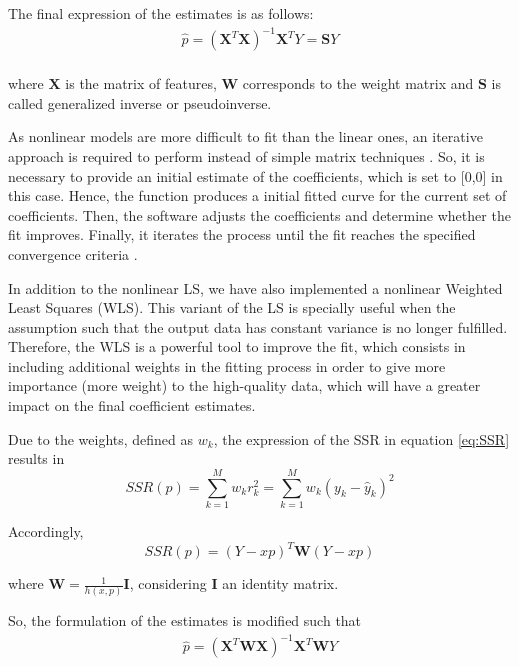 \documentclass[a4paper, report, oneside, UKenglish]{memoir}
\begin{document}
The final expression of the estimates is as follows:
\begin{equation}\label{eq:estimatorLS}
\begin{split}
    \hat{p} = (\textbf{X}^{T}\textbf{X})^{-1}\textbf{X}^{T}Y = \textbf{S}Y\\
\end{split}
\end{equation}

where $\textbf{X}$ is the matrix of features, $\textbf{W}$ corresponds to the weight matrix and $\textbf{S}$ is called generalized inverse or pseudoinverse.

As nonlinear models are more difficult to fit than the linear ones, an iterative approach is required to perform instead of simple matrix techniques \cite{MathWorksRegression}. So, it is necessary to provide an initial estimate of the coefficients, which is set to [0,0] in this case. Hence, the function produces a initial fitted curve for the current set of coefficients. Then, the software adjusts the coefficients and determine whether the fit improves. Finally, it iterates the process until the fit reaches the specified convergence criteria \cite{MathWorksRegression}. 

In addition to the nonlinear LS, we have also implemented a nonlinear Weighted Least Squares (WLS). This variant of the LS is specially useful when the assumption such that the output data has constant variance is no longer fulfilled. Therefore, the WLS is a powerful tool to improve the fit, which consists in including additional weights in the fitting process in order to give more importance (more weight) to the high-quality data, which will have a greater impact on the final coefficient estimates. 

Due to the weights, defined as $w_{k}$, the expression of the SSR in equation \eqref{eq:SSR} results in
\begin{equation}\label{eq:SSR_2}
    SSR(p) = \sum\limits_{k=1}^{M}w_{k}{r}_{k}^{2} = \sum\limits_{k=1}^{M}w_{k}(y_k - \hat{y}_k)^2
\end{equation}

Accordingly, 
\begin{equation}
    SSR(p) = (Y - xp)^T\textbf{W}(Y - xp)
\end{equation} 

where $\textbf{W} = \frac{1}{h(x,p)}\textbf{I}$, considering $\textbf{I}$ an identity matrix. 

So, the formulation of the estimates is modified such that
\begin{equation}\label{eq:estimatorWLS}
\begin{split}
    \hat{p} = (\textbf{X}^{T}\textbf{W}\textbf{X})^{-1}\textbf{X}^{T}\textbf{W}Y\\
\end{split}
\end{equation}
\end{document}
